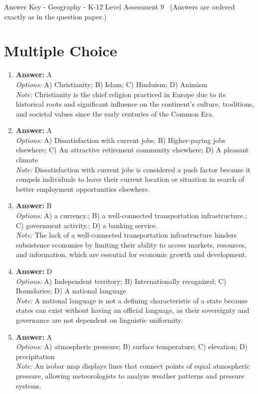 \documentclass[12pt]{article}
\begin{document}
\begin{center}
Answer Key - Geography - K-12 Level Assessment 9 \
\small (Answers are ordered exactly as in the question paper.)
\end{center}

\section*{Multiple Choice}
\begin{enumerate}[label=\arabic*.]
\item \textbf{Answer:} A
\\ \textit{Options:} A) Christianity; B) Islam; C) Hinduism; D) Animism
\\ \textit{Note:} Christianity is the chief religion practiced in Europe due to its historical roots and significant influence on the continent's culture, traditions, and societal values since the early centuries of the Common Era.
\item \textbf{Answer:} A
\\ \textit{Options:} A) Dissatisfaction with current jobs; B) Higher-paying jobs elsewhere; C) An attractive retirement community elsewhere; D) A pleasant climate
\\ \textit{Note:} Dissatisfaction with current jobs is considered a push factor because it compels individuals to leave their current location or situation in search of better employment opportunities elsewhere.
\item \textbf{Answer:} B
\\ \textit{Options:} A) a currency.; B) a well-connected transportation infrastructure.; C) government activity.; D) a banking service.
\\ \textit{Note:} The lack of a well-connected transportation infrastructure hinders subsistence economies by limiting their ability to access markets, resources, and information, which are essential for economic growth and development.
\item \textbf{Answer:} D
\\ \textit{Options:} A) Independent territory; B) Internationally recognized; C) Boundaries; D) A national language
\\ \textit{Note:} A national language is not a defining characteristic of a state because states can exist without having an official language, as their sovereignty and governance are not dependent on linguistic uniformity.
\item \textbf{Answer:} A
\\ \textit{Options:} A) atmospheric pressure; B) surface temperature; C) elevation; D) precipitation
\\ \textit{Note:} An isobar map displays lines that connect points of equal atmospheric pressure, allowing meteorologists to analyze weather patterns and pressure systems.
\end{enumerate}
\end{document}
